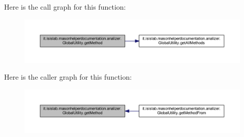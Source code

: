 Here is the call graph for this function\-:\nopagebreak
\begin{figure}[H]
\begin{center}
\leavevmode
\includegraphics[width=350pt]{classit_1_1isislab_1_1masonhelperdocumentation_1_1analizer_1_1_global_utility_adcb9db2ce5a150598f8a5195218048c2_cgraph}
\end{center}
\end{figure}




Here is the caller graph for this function\-:\nopagebreak
\begin{figure}[H]
\begin{center}
\leavevmode
\includegraphics[width=350pt]{classit_1_1isislab_1_1masonhelperdocumentation_1_1analizer_1_1_global_utility_adcb9db2ce5a150598f8a5195218048c2_icgraph}
\end{center}
\end{figure}


